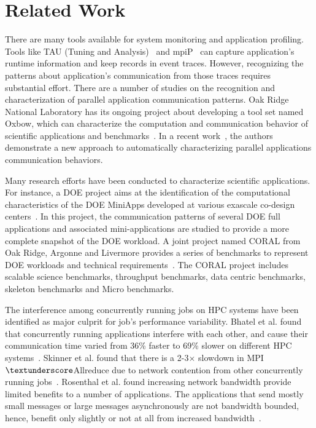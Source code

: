 \section{Related Work}
\label{sec:related_work}

There are many tools available for system monitoring and application profiling. 
Tools like TAU (Tuning and Analysis)~\cite{tau} and mpiP~\cite{mpip} can capture 
application's runtime information and keep records in event traces. 
However, recognizing the patterns about application's communication from those traces requires substantial effort. 
There are a number of studies on the recognition and characterization of parallel application communication patterns. 
Oak Ridge National Laboratory has its ongoing project about developing a tool set named Oxbow, 
which can characterize the computation and communication behavior of scientific applications and benchmarks~\cite{oxbow}. 
In a recent work~\cite{roth}, 
the authors demonstrate a new approach to automatically characterizing parallel applications communication behaviors. 


Many research efforts have been conducted to characterize scientific applications. 
For instance, a DOE project aims at the identification of the computational characteristics of 
the DOE MiniApps developed at various exascale co-design centers~\cite{designforwardwebpage}. 
In this project, the communication patterns of several DOE full applications and associated 
mini-applications are studied to provide a more complete snapshot of the DOE workload. 
A joint project named CORAL from Oak Ridge, Argonne and Livermore provides a series of 
benchmarks to represent DOE workloads and technical requirements~\cite{coral}. 
The CORAL project includes scalable science benchmarks, throughput benchmarks, 
data centric benchmarks, skeleton benchmarks and Micro benchmarks.  

The interference among concurrently running jobs on HPC systems 
have been identified as major culprit for job's performance variability. 
Bhatel et al. found that concurrently running applications interfere with each other, 
and cause their communication time varied from 
36\% faster to 69\% slower on different HPC systems~\cite{abhinav-sc13}. 
Skinner et al. found that  there is a 2-3$\times$ slowdown in MPI$\textunderscore$Allreduce 
due to network contention from other concurrently running jobs~\cite{skinner}. 
Rosenthal et al. found increasing network bandwidth provide limited benefits to a number of applications. 
The applications that send mostly small messages or large messages asynchronously 
are not bandwidth bounded, hence, benefit only slightly or not at all from increased bandwidth~\cite{rosenthal}.

